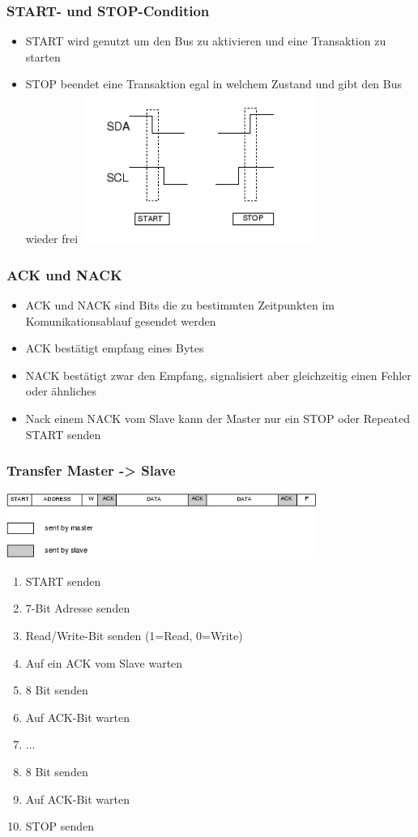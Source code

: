 \documentclass[ngerman,compress]{beamer}
\begin{document}
\begin{frame}
	\frametitle{START- und STOP-Condition}
	\begin{itemize}
		\item START wird genutzt um den Bus zu aktivieren und eine Transaktion zu starten
		\item STOP beendet eine Transaktion egal in welchem Zustand und gibt den Bus wieder frei
		\includegraphics[width=3in]{i2c-tutorial-star-stop}
	\end{itemize}
\end{frame}

\begin{frame}
	\frametitle{ACK und NACK}
	\begin{itemize}
		\item ACK und NACK sind Bits die zu bestimmten Zeitpunkten im Komunikationsablauf gesendet werden
		\item ACK bestätigt empfang eines Bytes
		\item NACK bestätigt zwar den Empfang, signalisiert aber gleichzeitig einen Fehler oder ähnliches
		\item Nack einem NACK vom Slave kann der Master nur ein STOP oder Repeated START senden
	\end{itemize}
\end{frame}

\begin{frame}
	\frametitle{Transfer Master -> Slave}
	\includegraphics[width=4in]{i2c-tutorial-master-slave}
	\begin{enumerate}
		\item START senden
		\item 7-Bit Adresse senden
		\item Read/Write-Bit senden (1=Read, 0=Write)
		\item Auf ein ACK vom Slave warten
		\item 8 Bit senden
		\item Auf ACK-Bit warten
		\item ...
		\item 8 Bit senden
		\item Auf ACK-Bit warten
		\item STOP senden
	\end{enumerate}
\end{frame}
\end{document}
